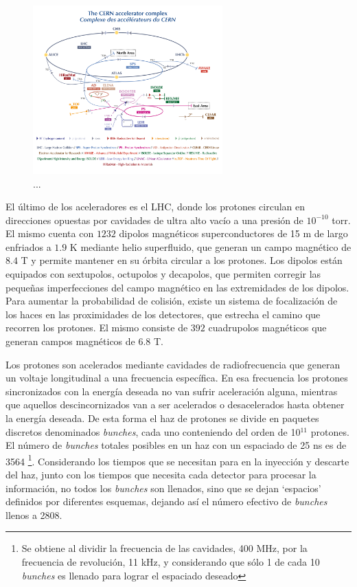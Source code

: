 \begin{figure}
  \centering
  \includegraphics[width=0.65\textwidth]{images/LHC_complex.png}
  \caption{...}
  \label{LHC_complex}
\end{figure}

El último de los aceleradores es el LHC, donde los protones circulan en direcciones opuestas por cavidades de ultra alto vacío a una presión de $10^{-10}$ torr. El mismo cuenta con $1232$ dipolos magnéticos superconductores de 15 m de largo enfriados a $1.9$ K mediante helio superfluido, que generan un campo magnético de $8.4$ T y permite mantener en su órbita circular a los protones. Los dipolos están equipados con sextupolos, octupolos y decapolos, que permiten corregir las pequeñas imperfecciones del campo magnético en las extremidades de los dipolos. Para aumentar la probabilidad de colisión, existe un sistema de focalización de los haces en las proximidades de los detectores, que estrecha el camino que recorren los protones. El mismo consiste de $392$ cuadrupolos magnéticos que generan campos magnéticos de $6.8$ T. 

Los protones son acelerados mediante cavidades de radiofrecuencia que generan un voltaje longitudinal a una frecuencia específica. En esa frecuencia los protones sincronizados con la energía deseada no van sufrir aceleración alguna, mientras que aquellos descincornizados van a ser acelerados o desacelerados hasta obtener la energía deseada. De esta forma el haz de protones se divide en paquetes discretos denominados \textit{bunches}, cada uno conteniendo del orden de 10$^{11}$ protones. El número de \textit{bunches} totales posibles en un haz con un espaciado de 25 ns es de 3564 \footnote{Se obtiene al dividir la frecuencia de las cavidades, 400 MHz, por la frecuencia de revolución, 11 kHz, y considerando que sólo 1 de cada 10 \textit{bunches} es llenado para lograr el espaciado deseado}. Considerando los tiempos que se necesitan para en la inyección y descarte del haz, junto con los tiempos que necesita cada detector para procesar la información, no todos los \textit{bunches} son llenados, sino que se dejan `espacios' definidos por diferentes esquemas, dejando así el número efectivo de \textit{bunches} llenos a 2808.

